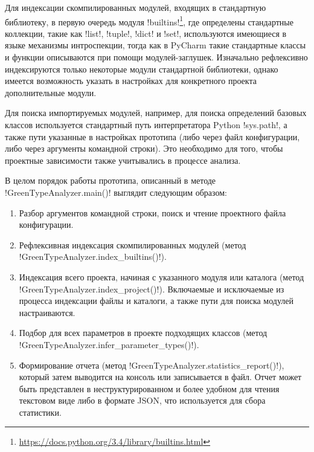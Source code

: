 Для индексации скомпилированных модулей, входящих в стандартную библиотеку, в
первую очередь модуля
!builtins!\footnote{\url{https://docs.python.org/3.4/library/builtins.html}},
где определены стандартные коллекции, такие как !list!, !tuple!, !dict! и !set!,
используются имеющиеся в языке механизмы интроспекции, тогда как в PyCharm
такие стандартные классы и функции описываются при помощи модулей-заглушек.
Изначально рефлексивно индексируются только некоторые модули стандартной
библиотеки, однако имеется возможность указать в настройках для конкретного
проекта дополнительные модули.

Для поиска импортируемых модулей, например, для поиска определений базовых
классов используется стандартный путь интерпретатора Python !sys.path!, а также пути
указанные в настройках прототипа (либо через файл конфигурации, либо через
аргументы командной строки). Это необходимо для того, чтобы проектные
зависимости также учитывались в процессе анализа.

В целом порядок работы прототипа, описанный в методе !GreenTypeAnalyzer.main()! 
выглядит следующим образом:

\begin{enumerate}
    \item Разбор аргументов командной строки, поиск и чтение проектного файла
      конфигурации.

    \item Рефлексивная индексация скомпилированных модулей (метод
      !GreenTypeAnalyzer.index_builtins()!).

    \item Индексация всего проекта, начиная с указанного модуля или каталога 
      (метод !GreenTypeAnalyzer.index_project()!).
      Включаемые и исключаемые из процесса индексации файлы и каталоги, а также
      пути для поиска модулей настраиваются. 

    \item Подбор для всех параметров в проекте подходящих классов (метод
      !GreenTypeAnalyzer.infer_parameter_types()!).

    \item Формирование отчета (метод !GreenTypeAnalyzer.statistics_report()!),
      который затем выводится на консоль или записывается в файл. Отчет может
      быть представлен в неструктурированном и более удобном для чтения
      текстовом виде либо в формате JSON, что используется для сбора статистики.

\end{enumerate}


